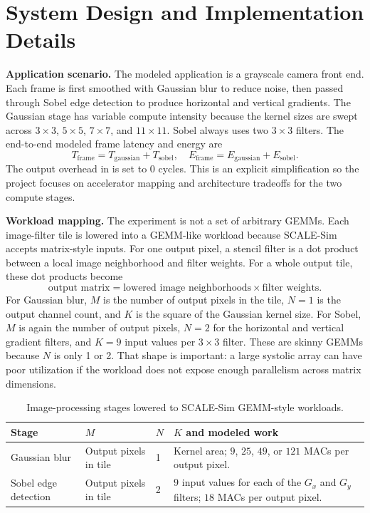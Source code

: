 \documentclass[12pt]{article}
\begin{document}
\section{System Design and Implementation Details}

\textbf{Application scenario.} The modeled application is a grayscale camera front end. Each frame is first smoothed with Gaussian blur to reduce noise, then passed through Sobel edge detection to produce horizontal and vertical gradients. The Gaussian stage has variable compute intensity because the kernel sizes are swept across $3\times3$, $5\times5$, $7\times7$, and $11\times11$. Sobel always uses two $3\times3$ filters. The end-to-end modeled frame latency and energy are
\[
T_{\text{frame}} = T_{\text{gaussian}} + T_{\text{sobel}},
\quad
E_{\text{frame}} = E_{\text{gaussian}} + E_{\text{sobel}}.
\]
The output overhead in  is set to 0 cycles. This is an explicit simplification so the project focuses on accelerator mapping and architecture tradeoffs for the two compute stages.

\textbf{Workload mapping.} The experiment is not a set of arbitrary GEMMs. Each image-filter tile is lowered into a GEMM-like workload because SCALE-Sim accepts matrix-style inputs. For one output pixel, a stencil filter is a dot product between a local image neighborhood and filter weights. For a whole output tile, these dot products become
\[
\text{output matrix} = \text{lowered image neighborhoods} \times \text{filter weights}.
\]
For Gaussian blur, $M$ is the number of output pixels in the tile, $N=1$ is the output channel count, and $K$ is the square of the Gaussian kernel size. For Sobel, $M$ is again the number of output pixels, $N=2$ for the horizontal and vertical gradient filters, and $K=9$ input values per $3\times3$ filter. These are skinny GEMMs because $N$ is only 1 or 2. That shape is important: a large systolic array can have poor utilization if the workload does not expose enough parallelism across matrix dimensions.

\begin{table}[H]
\centering
\small
\caption{Image-processing stages lowered to SCALE-Sim GEMM-style workloads.}
\begin{tabularx}{\textwidth}{l l l X}
\toprule
Stage & $M$ & $N$ & $K$ and modeled work \\
\midrule
Gaussian blur & Output pixels in tile & 1 & Kernel area; $9$, $25$, $49$, or $121$ MACs per output pixel. \\
Sobel edge detection & Output pixels in tile & 2 & $9$ input values for each of the $G_x$ and $G_y$ filters; $18$ MACs per output pixel. \\
\bottomrule
\end{tabularx}
\end{table}
\end{document}
